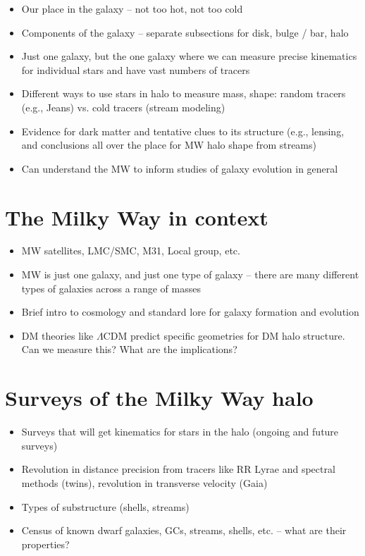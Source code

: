 \begin{itemize}
	\item Our place in the galaxy -- not too hot, not too cold
	\item Components of the galaxy -- separate subsections for disk, bulge / bar, halo
	\item Just one galaxy, but the one galaxy where we can measure precise kinematics for individual stars and have vast numbers of tracers
	\item Different ways to use stars in halo to measure mass, shape: random tracers (e.g., Jeans) vs. cold tracers (stream modeling)
	\item Evidence for dark matter and tentative clues to its structure (e.g., lensing, and conclusions all over the place for MW halo shape from streams)
	\item Can understand the MW to inform studies of galaxy evolution in general
\end{itemize}

\section{The Milky Way in context}\label{sec:milkyway-context}

\begin{itemize}
	\item MW satellites, LMC/SMC, M31, Local group, etc.
	\item MW is just one galaxy, and just one type of galaxy -- there are many different types of galaxies across a range of masses
	\item Brief intro to cosmology and standard lore for galaxy formation and evolution
	\item DM theories like $\Lambda$CDM predict specific geometries for DM halo structure. Can we measure this? What are the implications?
\end{itemize}

\section{Surveys of the Milky Way halo}\label{sec:surveys}

\begin{itemize}
	\item Surveys that will get kinematics for stars in the halo (ongoing and future surveys)
	\item Revolution in distance precision from tracers like RR Lyrae and spectral methods (twins), revolution in transverse velocity (Gaia)
	\item Types of substructure (shells, streams)
	\item Census of known dwarf galaxies, GCs, streams, shells, etc. -- what are their properties?
\end{itemize}

